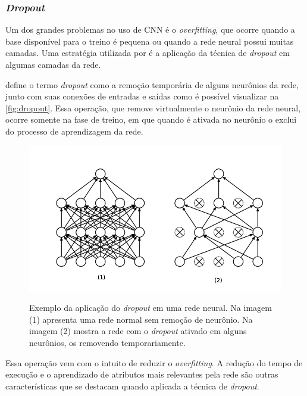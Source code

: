 \subsubsection{\textit{Dropout}}
Um dos grandes problemas no uso de CNN é o \textit{overfitting}, que ocorre quando a base disponível para o treino é pequena ou quando a rede neural possui muitas camadas. Uma estratégia utilizada por  é a aplicação da técnica de \textit{dropout} em algumas camadas da rede.
\par {} define o termo \textit{dropout} como a remoção temporária de alguns neurônios da rede, junto com suas conexões de entradas e saídas como é possível visualizar na \autoref{fig:dropout}. Essa operação, que remove virtualmente o neurônio da rede neural, ocorre somente na fase de treino, em que quando é ativada no neurônio o exclui do processo de aprendizagem da rede. 
\begin{figure}[H]
  \centering
  \caption{Exemplo da aplicação do \textit{dropout} em uma rede neural. Na imagem (1) apresenta uma rede normal sem remoção de neurônio. Na imagem (2) mostra a rede com o \textit{dropout} ativado em alguns neurônios, os removendo temporariamente.}
  \includegraphics[width=400pt]{dados/figuras/dropout}
  \label{fig:dropout}
\end{figure} 
\par Essa operação vem com o intuito de reduzir o \textit{overfitting}. A redução do tempo de execução e o aprendizado de atributos mais relevantes pela rede são outras características que se destacam quando aplicada a técnica de \textit{dropout}.


